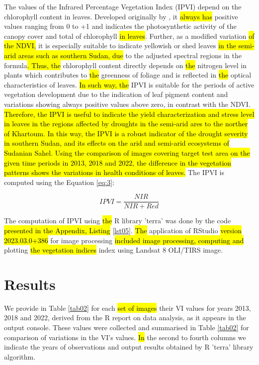 \documentclass[jimaging,article,submit,pdftex,moreauthors]{Definitions/mdpi}
\begin{document}
The values of the Infrared Percentage Vegetation Index (IPVI) depend on the chlorophyll content in leaves. Developed originally by \cite{CRIPPEN199071}, it \hl{always has} positive values ranging from 0 to +1 and indicates the photosynthetic activity of the canopy cover and total of chlorophyll\hl{ in leaves}. Further, as a modified variation\hl{ of the NDVI, }it is especially suitable to indicate yellowish or shed leaves \hl{in the semi-arid areas such as southern Sudan, due }to the adjusted spectral regions in the formula\hl{. Thus, the }chlorophyll content directly depends on \hl{the }nitrogen level in plants which contributes to \hl{the }greenness of foliage and is reflected in \hl{the }optical characteristics of leaves. \hl{In such way, the }IPVI is suitable for the periods of active vegetation development due to the indication of leaf pigment content and variations showing always positive values above zero, in contrast with the NDVI. \hl{Therefore, the IPVI is useful to indicate the yield characterization and stress level in leaves in the regions affected by droughts in the semi-arid ares to the norther of Khartoum. In this way, the IPVI is a robust indicator of the drought severity in southern Sudan, and its effects on the arid and semi-arid ecosystems of Sudanian Sahel. Using the comparison of images covering target test area on the given time periods in 2013, 2018 and 2022, the difference in the vegetation patterns shows the variations in health conditions of leaves. }The IPVI is computed using the Equation \ref{eq:3}:

\begin{equation}\label{eq:3}
	IPVI=\dfrac{NIR}{NIR + Red}
\end{equation}

The computation of IPVI using \hl{the }R library 'terra' was done by the code \hl{presented in the Appendix, Listing }\ref{lst05}. \hl{The} application of RStudio \hl{version 2023.03.0+386 } \cite{RStudio} for image processing \hl{included image processing, computing and} plotting \hl{the vegetation indices} index using Landsat 8 OLI/TIRS image. 

\section{Results}

We provide in Table \ref{tab02} for each \hl{set of images} their VI values for years 2013, 2018 and 2022, derived from the R report on data analysis, as it appears in the output console. These values were collected and summarised in Table \ref{tab02} for comparison of variations in the VI's values. \hl{In }the second to fourth columns we indicate the years of observations and output results obtained by R 'terra' library algorithm. 
\end{document}
